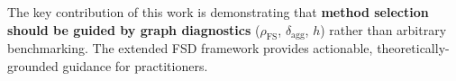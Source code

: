 The key contribution of this work is demonstrating that \textbf{method selection should be guided by graph diagnostics} ($\rho_{\text{FS}}$, $\delta_{\text{agg}}$, $h$) rather than arbitrary benchmarking. The extended FSD framework provides actionable, theoretically-grounded guidance for practitioners.
